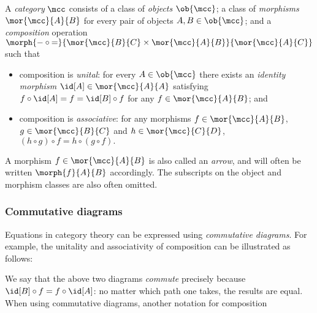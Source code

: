 \begin{definition}[Categories]
    \label{def:category}
    A \emph{category} \(\mcc\) consists of a class of \emph{objects}
    \(\ob{\mcc}\); a class of \emph{morphisms} \(\mor{\mcc}{A}{B}\)
    for every pair of objects \(A, B \in \ob{\mcc}\); and a \emph{composition}
    operation \(
        \morph{
            {-} \circ {=}
        }{
            \mor{\mcc}{B}{C} \times \mor{\mcc}{A}{B}
        }{
            \mor{\mcc}{A}{C}
        }
    \) such that
    \begin{itemize}
        \item composition is \emph{unital}: for every \(
                    A \in \ob{\mcc}
                \) there exists an \emph{identity morphism} \(
                    \id[A] \in \mor{\mcc}{A}{A}
                \) satisfying \(
                    f \circ \id[A] = f = \id[B] \circ f
                \) for any \(
                    f \in \mor{\mcc}{A}{B}
                \); and
        \item composition is \emph{associative}: for any morphisms \(
                    f \in \mor{\mcc}{A}{B}
                \), \(
                    g \in \mor{\mcc}{B}{C}
                \) and \(h \in \mor{\mcc}{C}{D}\), \(
                    (h \circ g) \circ f = h \circ (g \circ f).
                \)
    \end{itemize}
\end{definition}

A morphism \(f \in \mor{\mcc}{A}{B}\) is also called an \emph{arrow}, and will
often be written \(\morph{f}{A}{B}\) accordingly.
The subscripts on the object and morphism classes are also often omitted.

\subsubsection{Commutative diagrams}

Equations in category theory can be expressed using \emph{commutative diagrams}.
For example, the unitality and associativity of composition can be illustrated
as follows:

\begin{center}
    
    \quad
    
\end{center}

We say that the above two diagrams \emph{commute} precisely because \(
    \id[B] \circ f = f \circ \id[A]
\): no matter which path one takes, the results are equal.
When using commutative diagrams, another notation for composition


